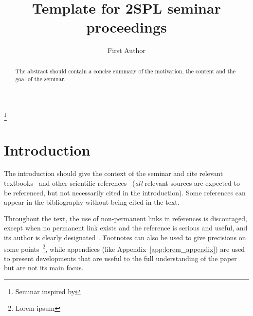 \documentclass[
 reprint,
 preprintnumbers,
 nobibnotes,
 nofootinbib,
 longbibliography,
 amsmath,amssymb,
 aps,pra,
 onecolumn
]{revtex4-2}
\renewcommand{\journalname}{Strasbourg Students Physical Letters}
\renewcommand{\volumename}{X}
\renewcommand{\numbername}{02xx}
\newcommand{\header}{{\footnotesize\today} \hspace{7em} {\sc\journalname} \; {\bf\volumename},\; \numbername \; \hspace{9em} {\footnotesize CC BY-SA 4.0}}
\begin{document}
\preprint{\header}%



\title{Template for 2SPL seminar proceedings}
\thanks{Seminar inspired by}%

\author{First Author}



\begin{abstract}
    The abstract should contain a concise summary of the motivation, the content and the goal of the seminar.
\end{abstract}

\maketitle


\tableofcontents%

\section*{Introduction}

The introduction should give the context of the seminar and cite relevant textbooks~\cite{landauQuantum} and other scientific references~\cite{wheeler1949electrodynamics,beaudoin2024extending} ({\em all} relevant sources are expected to be referenced, but not necessarily cited in the introduction). Some references can appear in the bibliography without being cited in the text.

Throughout the text, the use of non-permanent links in references is discouraged, except when no permanent link exists and the reference is serious and useful, and its author is clearly designated~\cite{skinner2018qft}. Footnotes can also be used to give precisions on some points~\footnote{Lorem ipsum}, while appendices (like Appendix~\ref{app:lorem_appendix}) are used to present developments that are useful to the full understanding of the paper but are not its main focus.
\end{document}
